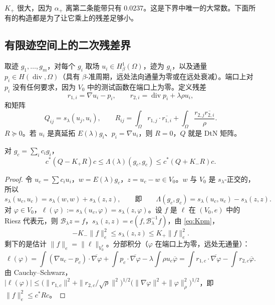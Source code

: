 \documentclass[11pt,a4paper,fontset=fandol]{ctexart}
\begin{document}
\begin{remark}
$K_+$ 很大，因为 $\alpha_+$ 离第二条能带只有 $0.0237$。这是下界中唯一的大常数。下面所有的构造都是为了让它乘上的残差足够小。
\end{remark}

\subsection{有限迹空间上的二次残差界}

取迹 $g_1,\dots,g_m$，对每个 $g_i$ 取场 $u_i\in H^1_\beta(\Omega)$，迹为 $g_i$，以及通量 $p_i\in H(\operatorname{div},\Omega)$（具有 $\beta$-准周期，远处法向通量为零或在远处衰减）。端口上对 $p_i$ 没有任何要求，因为 $V_0$ 中的测试函数在端口上为零。定义残差
\[
r_{1,i}=\nabla u_i-p_i,\qquad r_{2,i}=\operatorname{div}p_i+\lambda\rho u_i ,
\]
和矩阵
\begin{equation}
\label{eq:QR}
Q_{ij}=s_\lambda(u_j,u_i),\qquad R_{ij}=\int_\Omega r_{1,j}\cdot\overline{r_{1,i}}+\int_\Omega\frac{r_{2,j}\overline{r_{2,i}}}{\rho} .
\end{equation}
$R\succeq0$。若 $u_i$ 是真延拓 $E(\lambda)g_i$、$p_i=\nabla u_i$，则 $R=0$，$Q$ 就是 DtN 矩阵。

\begin{theorem}
\label{thm:dtn-two-sided}
对 $g_c=\sum_ic_ig_i$，
\[
c^*(Q-K_+R)c\le\Lambda(\lambda)(g_c,g_c)\le c^*(Q+K_-R)c .
\]
\end{theorem}

\begin{proof}
令 $u_c=\sum c_iu_i$，$w=E(\lambda)g_c$，$z=u_c-w\in V_0$。$w$ 与 $V_0$ 是 $s_\lambda$-正交的，所以
\[
s_\lambda(u_c,u_c)=s_\lambda(w,w)+s_\lambda(z,z),\qquad\text{即}\qquad \Lambda(g_c,g_c)=s_\lambda(u_c,u_c)-s_\lambda(z,z).
\]
对 $\varphi\in V_0$，$\ell(\varphi):=s_\lambda(u_c,\varphi)=s_\lambda(z,\varphi)$。设 $f$ 是 $\ell$ 在 $(V_0,e)$ 中的 Riesz 代表元，则 $\mathcal B_\lambda z=f$，$s_\lambda(z,z)=e(f,\mathcal B_\lambda^{-1}f)$，由 \eqref{eq:Kpm}，
\[
-K_-\|f\|_e^2\le s_\lambda(z,z)\le K_+\|f\|_e^2 .
\]
剩下的是估计 $\|f\|_e=\|\ell\|_{V_0^*}$。分部积分（$\varphi$ 在端口上为零，远处无通量）：
\[
\ell(\varphi)=\int(\nabla u_c-p_c)\cdot\overline{\nabla\varphi}+\int p_c\cdot\overline{\nabla\varphi}-\lambda\int\rho u_c\overline\varphi
=\int r_{1,c}\cdot\overline{\nabla\varphi}-\int r_{2,c}\overline\varphi .
\]
由 Cauchy--Schwarz，$|\ell(\varphi)|\le\bigl(\|r_{1,c}\|^2+\|r_{2,c}/\sqrt\rho\|^2\bigr)^{1/2}\bigl(\|\nabla\varphi\|^2+\|\varphi\|_\rho^2\bigr)^{1/2}$，即 $\|f\|_e^2\le c^*Rc$。
\end{proof}
\end{document}
